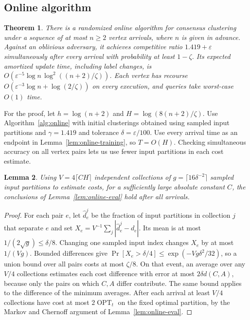 \documentclass[11pt]{article}
\newtheorem{theorem}{Theorem}[section]
\newtheorem{lemma}[theorem]{Lemma}
\newcommand{\OPT}{\operatorname{OPT}}
\begin{document}
\subsection{Online algorithm}
\label{app:vote-online}

\begin{theorem}\label{joint:online}
There is a randomized online algorithm for consensus clustering under
a sequence of at most $n\ge2$ vertex arrivals, where $n$ is given in advance.
Against an oblivious adversary, it achieves competitive ratio
$1.419+\varepsilon$ simultaneously after every arrival with probability
at least $1-\zeta$. Its expected amortized update time, including label
changes, is
$O(\varepsilon^{-5}\log n\,\log^2((n+2)/\zeta))$.
Each vertex has recourse $O(\varepsilon^{-3}\log n+\log(2/\zeta))$
on every execution, and queries take worst-case $O(1)$ time.
\end{theorem}

For the proof, let $h=\log(n+2)$ and $H=\log(8(n+2)/\zeta)$.
Use Algorithm~\ref{alg:online} with initial clusterings obtained using sampled input partitions and
$\gamma=1.419$ and tolerance $\delta=\varepsilon/100$. Use every
arrival time as an endpoint in Lemma~\ref{lem:online-training}, so
$T=O(H)$. Checking simultaneous accuracy on all vertex pairs
lets us use fewer input partitions in each cost estimate.

\begin{lemma}\label{lem:vote-validation}
Using $V=4\lceil C H\rceil$ independent collections of
$g=\lceil16\delta^{-2}\rceil$ sampled input partitions to estimate
costs, for a sufficiently large absolute constant $C$, the conclusions of Lemma~\ref{lem:online-eval} hold
after all arrivals.
\end{lemma}
\begin{proof}
For each pair $e$, let $\widehat d^j_e$ be the fraction of input partitions in
collection $j$ that separate $e$ and set $X_e=V^{-1}\sum_j|\widehat d^j_e-d_e|$.
Its mean is at most $1/(2\sqrt g)\le\delta/8$. Changing one
sampled input index changes $X_e$ by at most $1/(Vg)$. Bounded
differences give $\Pr[X_e>\delta/4]\le\exp(-Vg\delta^2/32)$, so a
union bound over all pairs costs at most $\zeta/8$. On that event,
an average over any $V/4$ collections estimates each cost difference
with error at most $2\delta d(C,A)$, because only the pairs on which
$C,A$ differ contribute. The same bound applies to the difference
of the minimum averages. After each arrival at least $V/4$ collections have
cost at most $2\OPT_t$ on the fixed optimal partition, by the Markov and
Chernoff argument of Lemma~\ref{lem:online-eval}.
\end{proof}
\end{document}

